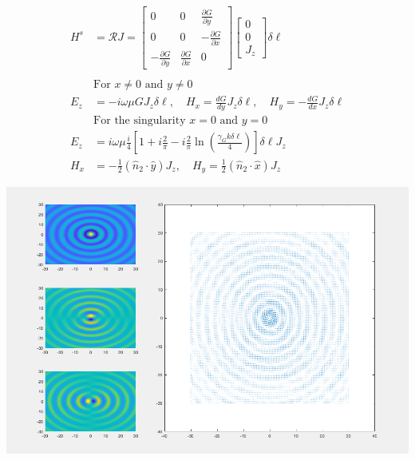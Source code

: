 \documentclass{article}
\renewcommand{\H}{\mathbf{H}}
\renewcommand{\H}{\mathbf{H}}
\newcommand{\0}{\varnothing}
\begin{document}
\begin{minipage}{0.5\textwidth}
\begin{align*}
         H^s &= \mathcal{R} J = \left[ \begin{array}{ccc} 0 & 0 & \frac{\partial G}{\partial y}\\ 
                            0 & 0 &-\frac{\partial G}{\partial x}\\ 
                            -\frac{\partial G}{\partial y} &\frac{\partial G}{\partial x} &0 \end{array} \right]
        \left[ \begin{array}{c} 
        0 \\ 0 \\ J_z \end{array} \right]\delta \ell\\
        \ \\
        &\text{For $x \neq 0$ and $y \neq 0$}\\
        E_z &= -i\omega\mu G J_z \delta \ell, \quad  H_x = \frac{dG}{dy} J_z \delta \ell, \quad H_y = -\frac{dG}{dx} J_z\delta \ell\\
        &\text{For the singularity $x = 0$ and $y = 0$}\\
        E_z &= i\omega\mu \frac{i}{4} \left[ 1 + i \frac{2}{\pi} -  i \frac{2}{\pi} \ln \left(\frac{\gamma_G k \delta \ell}{4}\right) \right] \delta \ell J_z 
        \\H_x &= -\frac{1}{2}(\hat{n}_2 \cdot \hat{y}) J_z , \quad H_y = \frac{1}{2}(\hat{n}_2 \cdot \hat{x}) J_z
\end{align*}
\end{minipage}
\begin{minipage}{0.5\textwidth}
{\centering
\includegraphics[width=1\columnwidth]{figures/JDipole}
}
\end{minipage}
\end{document}
